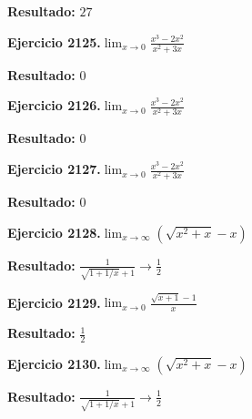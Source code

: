 \documentclass[10pt,a4paper]{article}
\begin{document}
\begin{solbox}
\textbf{Resultado:} \(\displaystyle 27\)
\end{solbox}

\begin{ejbox}
\textbf{Ejercicio 2125.}\quad $\lim_{x\to 0} \frac{x^3-2x^2}{x^2+3x}$
\end{ejbox}

\begin{solbox}
\textbf{Resultado:} \(\displaystyle 0\)
\end{solbox}

\newpage
\begin{ejbox}
\textbf{Ejercicio 2126.}\quad $\lim_{x\to 0} \frac{x^3-2x^2}{x^2+3x}$
\end{ejbox}

\begin{solbox}
\textbf{Resultado:} \(\displaystyle 0\)
\end{solbox}

\begin{ejbox}
\textbf{Ejercicio 2127.}\quad $\lim_{x\to 0} \frac{x^3-2x^2}{x^2+3x}$
\end{ejbox}

\begin{solbox}
\textbf{Resultado:} \(\displaystyle 0\)
\end{solbox}

\begin{ejbox}
\textbf{Ejercicio 2128.}\quad $\lim_{x\to \infty} (\sqrt{x^2+x} - x)$
\end{ejbox}

\begin{solbox}
\textbf{Resultado:} \(\displaystyle \frac{1}{\sqrt{1+1/x}+1} \to \frac{1}{2}\)
\end{solbox}

\newpage
\begin{ejbox}
\textbf{Ejercicio 2129.}\quad $\lim_{x\to 0} \frac{\sqrt{x+1}-1}{x}$
\end{ejbox}

\begin{solbox}
\textbf{Resultado:} \(\displaystyle \frac{1}{2}\)
\end{solbox}

\begin{ejbox}
\textbf{Ejercicio 2130.}\quad $\lim_{x\to \infty} (\sqrt{x^2+x} - x)$
\end{ejbox}

\begin{solbox}
\textbf{Resultado:} \(\displaystyle \frac{1}{\sqrt{1+1/x}+1} \to \frac{1}{2}\)
\end{solbox}
\end{document}
